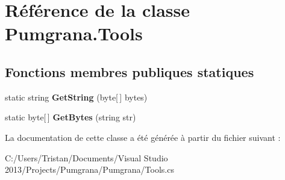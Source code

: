 \hypertarget{class_pumgrana_1_1_tools}{\section{Référence de la classe Pumgrana.\+Tools}
\label{class_pumgrana_1_1_tools}
}
\subsection*{Fonctions membres publiques statiques}
\begin{DoxyCompactItemize}
\item 
\hypertarget{class_pumgrana_1_1_tools_ad0abffcd23fae6f6aa4fac01339016e4}{static string {\bfseries Get\+String} (byte\mbox{[}$\,$\mbox{]} bytes)}\label{class_pumgrana_1_1_tools_ad0abffcd23fae6f6aa4fac01339016e4}

\item 
\hypertarget{class_pumgrana_1_1_tools_a20f33aef123dbd0f8e8ecf9a8b53ff70}{static byte\mbox{[}$\,$\mbox{]} {\bfseries Get\+Bytes} (string str)}\label{class_pumgrana_1_1_tools_a20f33aef123dbd0f8e8ecf9a8b53ff70}

\end{DoxyCompactItemize}


La documentation de cette classe a été générée à partir du fichier suivant \+:\begin{DoxyCompactItemize}
\item 
C\+:/\+Users/\+Tristan/\+Documents/\+Visual Studio 2013/\+Projects/\+Pumgrana/\+Pumgrana/Tools.\+cs\end{DoxyCompactItemize}
